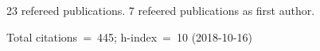 23 refereed publications. 7 refeered publications as first author.

Total citations~=~445; h-index~=~10 (2018-10-16)